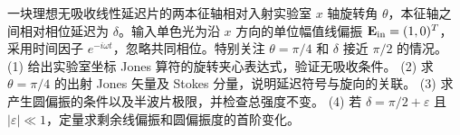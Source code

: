 一块理想无吸收线性延迟片的两本征轴相对入射实验室 \(x\) 轴旋转角 \(\theta\)，本征轴之间相对相位延迟为 \(\delta\)。输入单色光为沿 \(x\) 方向的单位幅值线偏振 \(\mathbf E_{\rm in}=(1,0)^T\)，采用时间因子 \(e^{-i\omega t}\)，忽略共同相位。特别关注 \(\theta=\pi/4\) 和 \(\delta\) 接近 \(\pi/2\) 的情况。
(1) 给出实验室坐标 Jones 算符的旋转夹心表达式，验证无吸收条件。
(2) 求 \(\theta=\pi/4\) 的出射 Jones 矢量及 Stokes 分量，说明延迟符号与旋向的关联。
(3) 求产生圆偏振的条件以及半波片极限，并检查总强度不变。
(4) 若 \(\delta=\pi/2+\varepsilon\) 且 \(|\varepsilon|\ll1\)，定量求剩余线偏振和圆偏振度的首阶变化。
